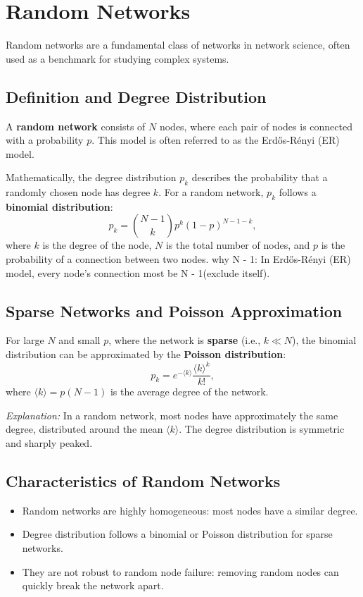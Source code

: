 \documentclass{article}
\begin{document}
\section{Random Networks}
Random networks are a fundamental class of networks in network science, often used as a benchmark for studying complex systems.

\subsection{Definition and Degree Distribution}
A \textbf{random network} consists of $N$ nodes, where each pair of nodes is connected with a probability $p$. This model is often referred to as the Erd\H{o}s-R\'enyi (ER) model.

Mathematically, the degree distribution $p_k$ describes the probability that a randomly chosen node has degree $k$. For a random network, $p_k$ follows a \textbf{binomial distribution}:
\begin{equation}
    p_k = \binom{N-1}{k} p^k (1-p)^{N-1-k},
\end{equation}
where $k$ is the degree of the node, $N$ is the total number of nodes, and $p$ is the probability of a connection between two nodes. 
why N - 1: In Erd\H{o}s-R\'enyi (ER) model, every node's connection most be N - 1(exclude itself).

\subsection{Sparse Networks and Poisson Approximation}
For large $N$ and small $p$, where the network is \textbf{sparse} (i.e., $k \ll N$), the binomial distribution can be approximated by the \textbf{Poisson distribution}:
\begin{equation}
    p_k = e^{-\langle k \rangle} \frac{\langle k \rangle^k}{k!},
\end{equation}
where $\langle k \rangle = p(N-1)$ is the average degree of the network.

\textit{Explanation:} In a random network, most nodes have approximately the same degree, distributed around the mean $\langle k \rangle$. The degree distribution is symmetric and sharply peaked.


\subsection{Characteristics of Random Networks}
\begin{itemize}
    \item Random networks are highly homogeneous: most nodes have a similar degree.
    \item Degree distribution follows a binomial or Poisson distribution for sparse networks.
    \item They are not robust to random node failure: removing random nodes can quickly break the network apart.
\end{itemize}
\end{document}
